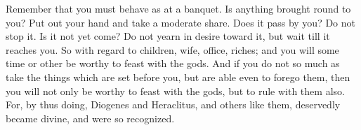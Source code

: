 Remember that  you must behave  as at a banquet.  Is anything brought  round to
you? Put out your  hand and take a moderate share. Does it  pass by you? Do not
stop it. Is it not yet come? Do not yearn in desire toward it, but wait till it
reaches you.  So with regard  to children, wife,  office, riches; and  you will
some time or other be worthy to feast with  the gods. And if you do not so much
as take the things which are set before  you, but are able even to forego them,
then you will not only be worthy to  feast with the gods, but to rule with them
also.  For, by  thus  doing, Diogenes  and Heraclitus,  and  others like  them,
deservedly became divine, and were so recognized.
